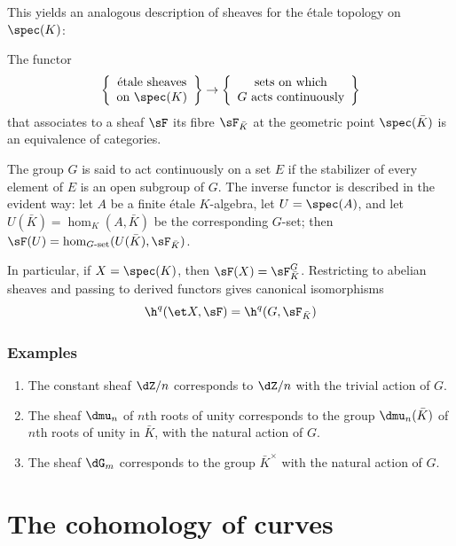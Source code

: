 \documentclass[oneside]{book}
\begin{document}
This yields an analogous description of sheaves for the étale topology on
$\spec(K)$:

\begin{proposition}\label{I:2-4-4}
The functor
\[
  \left\{\begin{array}{c}
          \textnormal{étale sheaves} \\
          \textnormal{on $\spec(K)$}
        \end{array}\right\}
  \to
  \left\{\begin{array}{c}
          \textnormal{sets on which} \\
          \textnormal{$G$ acts continuously}
        \end{array}\right\}
\]
that associates to a sheaf $\sF$ its fibre $\sF_{\bar K}$ at the
geometric point $\spec(\bar K)$ is an equivalence of categories.
\end{proposition}

The group $G$ is said to act continuously on a set $E$ if the stabilizer
of every element of $E$ is an open subgroup of $G$. The inverse functor
is described in the evident way: let $A$ be a finite étale
$K$-algebra, let $U=\spec(A)$, and let
$U(\bar K)=\hom_K(A,\bar K)$ be the corresponding $G$-set; then
$\sF(U)=\hom_{G\text{-set}}(U(\bar K),\sF_{\bar K})$.

In particular, if $X=\spec(K)$, then $\sF(X)=\sF_{\bar K}^G$. Restricting
to abelian sheaves and passing to derived functors gives canonical
isomorphisms
\[
  \h^q(\et X,\sF) = \h^q(G,\sF_{\bar K})
\]

\subsubsection{Examples}\label{I:2-4-5}

\begin{enumerate}[\indent a)]
  \item The constant sheaf $\dZ/n$ corresponds to $\dZ/n$ with the
    trivial action of $G$.
  \item The sheaf $\dmu_n$ of $n$th roots of unity corresponds to the
    group $\dmu_n(\bar K)$ of $n$th roots of unity in $\bar K$, with
    the natural action of $G$.
  \item The sheaf $\dG_m$ corresponds to the group $\bar K^\times$ with
    the natural action of $G$.
\end{enumerate}

\section{The cohomology of curves}\label{I:3}
\end{document}
